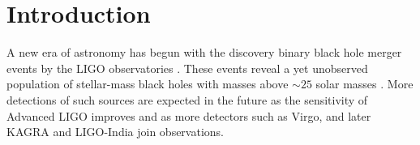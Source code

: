 \documentclass[preprint,onecolumn,,tightenlines,superscriptaddress,showpacs,nofootinbib,eqsecnum,amsfonts,amsmath]{revtex4}
\def\red#1{\textcolor{red}{#1}}
\begin{document}

\section{Introduction}
\label{I}

A new era of astronomy has begun with the discovery binary black hole merger
events by the LIGO observatories
\cite{GW150914-DETECTION,GW151226-DETECTION}. These events reveal a yet
unobserved population of stellar-mass black holes with masses above $\sim 25$
solar masses \cite{GW150914-ASTRO}. More detections of such sources are expected
in the future as the sensitivity of Advanced LIGO \cite{GW150914-DETECTORS}
improves and as more detectors such as Virgo\cite{acernese15:_advan_virgo}, and
later KAGRA \cite{aso13:_kagra} and LIGO-India \cite{iyer11:_ligo_india} join
observations.
\end{document}
